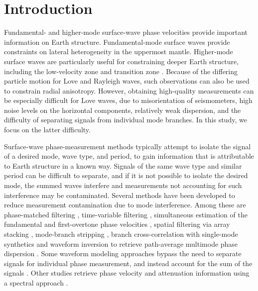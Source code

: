 \documentclass[12pt,oneside]{book}
\begin{document}
\section{Introduction}
Fundamental- and higher-mode surface-wave phase velocities provide important information on Earth structure. Fundamental-mode surface waves provide constraints on lateral heterogeneity in the uppermost mantle. Higher-mode surface waves are particularly useful for constraining deeper Earth structure, including the low-velocity zone and transition zone \citep{LaskeWidmer2007}. Because of the differing particle motion for Love and Rayleigh waves, such observations can also be used to constrain radial anisotropy. However, obtaining high-quality measurements can be especially difficult for Love waves, due to misorientation of seismometers, high noise levels on the horizontal components, relatively weak dispersion, and the difficulty of separating signals from individual mode branches. In this study, we focus on the latter difficulty. 

Surface-wave phase-measurement methods typically attempt to isolate the signal of a desired mode, wave type, and period, to gain information that is attributable to Earth structure in a known way. Signals of the same wave type and similar period can be difficult to separate, and if it is not possible to isolate the desired mode, the summed waves interfere and measurements not accounting for such interference may be contaminated. Several methods have been developed to reduce measurement contamination due to mode interference. Among these are phase-matched filtering \citep[e.g.,][]{HerrinGoforth1977, HerrinGoforth1979}, time-variable filtering \citep[e.g.,][]{Cara1973, Dziewonskietal1969, Landismanetal1969, Pilant1964, Knopoff1966}, simultaneous estimation of the fundamental and first-overtone phase velocities \citep[e.g.,][]{Forsyth1975}, spatial filtering via array stacking \citep[e.g.,][]{Nolet1975, NoletPanza1976, Cara1978, OkalJo1987}, mode-branch stripping \citep[e.g.,][]{vanHeijstWoodhouse1997, vanHeijstWoodhouse1999}, branch cross-correlation with single-mode synthetics \citep[e.g.,][]{LernerLamJordan1983, CaraLeveque1987} and waveform inversion to retrieve path-average multimode phase dispersion \citep[e.g.,][]{GeeJordan1992, Gahertyetal1996, YoshizawaKennett2002modes}. Some waveform modeling approaches bypass the need to separate signals for individual phase measurement, and instead account for the sum of the signals \citep[e.g.,][]{WoodhouseDziewonski1984, StutzmannMontagner1993}. Other studies retrieve phase velocity and attenuation information using a spectral approach \citep[e.g.,][]{JobertRoult1976, Roultetal1990, RoultRomanowicz1984, OkalJo1987}. 
\end{document}
